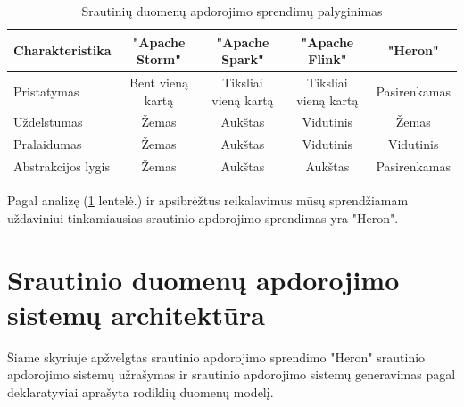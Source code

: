 \documentclass{VUMIFPSbakalaurinis}
\begin{document}
\begin{table}[!htbp]
    \begin{center}
        \caption{Srautinių duomenų apdorojimo sprendimų palyginimas}
        \label{table:comparer}
        \begin{tabular}{ | l | c | c | c | c | }
            \hline
            \cellcolor[gray]{0.8} Charakteristika & \cellcolor[gray]{0.9} "Apache Storm" & \cellcolor[gray]{0.9} "Apache Spark" & \cellcolor[gray]{0.9} "Apache Flink" & \cellcolor[gray]{0.9} "Heron" \\* \hline
            \cellcolor[gray]{0.9} Pristatymas & Bent vieną kartą & Tiksliai vieną kartą & Tiksliai vieną kartą & Pasirenkamas \\* \hline
            \cellcolor[gray]{0.9} Uždelstumas & Žemas & Aukštas & Vidutinis & Žemas \\* \hline
            \cellcolor[gray]{0.9} Pralaidumas & Žemas & Aukštas & Vidutinis & Vidutinis \\* \hline
            \cellcolor[gray]{0.9} Abstrakcijos lygis & Žemas & Aukštas & Aukštas & Pasirenkamas \\* \hline
        \end{tabular}
    \end{center}
\end{table}\par

Pagal analizę (\ref{table:comparer} lentelė.) ir apsibrėžtus reikalavimus mūsų sprendžiamam uždaviniui tinkamiausias srautinio apdorojimo sprendimas yra "Heron". \par

\section{Srautinio duomenų apdorojimo sistemų architektūra}

Šiame skyriuje apžvelgtas srautinio apdorojimo sprendimo "Heron" srautinio apdorojimo sistemų užrašymas ir srautinio apdorojimo sistemų generavimas pagal deklaratyviai aprašyta rodiklių duomenų modelį.
\end{document}

